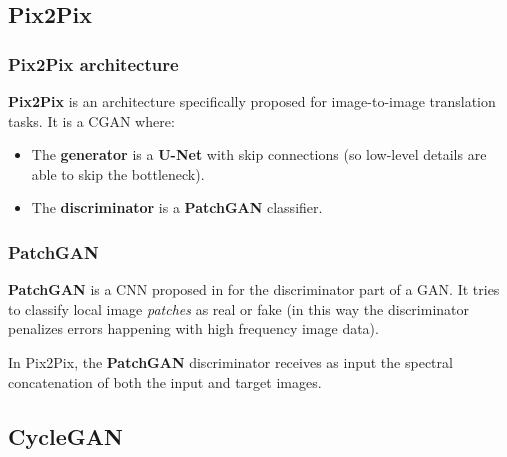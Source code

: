
\subsection{Pix2Pix}

\begin{frame}
    \frametitle{Pix2Pix architecture}
    \textbf{Pix2Pix} \cite{pix2pix} is an architecture specifically proposed for image-to-image translation tasks. It is a CGAN where:
    \begin{itemize}
        \item The \textbf{generator} is a \textbf{U-Net} with skip connections (so low-level details are able to skip the bottleneck).
        \item The \textbf{discriminator} is a \textbf{PatchGAN} classifier.
    \end{itemize}
\end{frame}

\begin{frame}
    \frametitle{PatchGAN}
    \textbf{PatchGAN} is a CNN proposed in \cite{pix2pix} for the discriminator part of a GAN. It tries to classify local image \emph{patches} as real or fake (in this way the discriminator penalizes errors happening with high frequency image data).

    In Pix2Pix, the \textbf{PatchGAN} discriminator receives as input the spectral concatenation of both the input and target images.
\end{frame}

\subsection{CycleGAN}